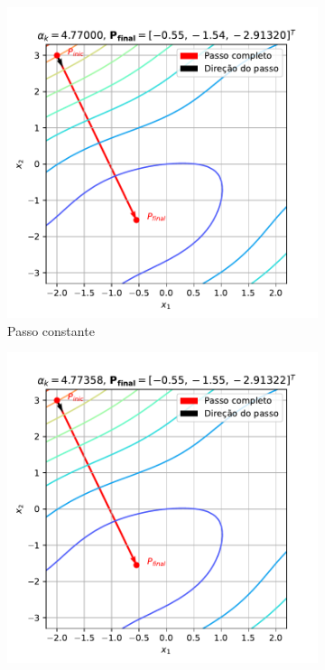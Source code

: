 \documentclass[10pt, a4paper]{article}
\begin{document}
\begin{figure}[htpb]
  \centering
  \begin{subfigure}[b]{0.32\textwidth}
      \centering
      \includegraphics[width=\textwidth]{images/q2b_1.pdf}
      \caption{Passo constante}
      \label{fig:q2b_1}
  \end{subfigure}
  \hfill
  \begin{subfigure}[b]{0.32\textwidth}
      \centering
      \includegraphics[width=\textwidth]{images/q2b_2.pdf}

\end{subfigure}
\end{figure}
\end{document}
